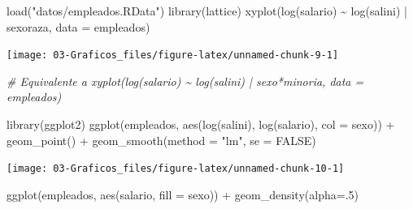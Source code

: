 \documentclass[
]{book}
\newenvironment{Shaded}{\begin{snugshade}}{\end{snugshade}}
\newcommand{\AttributeTok}[1]{\textcolor[rgb]{0.77,0.63,0.00}{#1}}
\newcommand{\CommentTok}[1]{\textcolor[rgb]{0.56,0.35,0.01}{\textit{#1}}}
\newcommand{\ConstantTok}[1]{\textcolor[rgb]{0.00,0.00,0.00}{#1}}
\newcommand{\DecValTok}[1]{\textcolor[rgb]{0.00,0.00,0.81}{#1}}
\newcommand{\FunctionTok}[1]{\textcolor[rgb]{0.00,0.00,0.00}{#1}}
\newcommand{\NormalTok}[1]{#1}
\newcommand{\SpecialCharTok}[1]{\textcolor[rgb]{0.00,0.00,0.00}{#1}}
\newcommand{\StringTok}[1]{\textcolor[rgb]{0.31,0.60,0.02}{#1}}
\theoremstyle{break}
\theoremstyle{nonumberplain}
\begin{document}
\begin{Shaded}
\begin{Highlighting}[]
\FunctionTok{load}\NormalTok{(}\StringTok{"datos/empleados.RData"}\NormalTok{)}
\FunctionTok{library}\NormalTok{(lattice)}
\FunctionTok{xyplot}\NormalTok{(}\FunctionTok{log}\NormalTok{(salario) }\SpecialCharTok{\textasciitilde{}} \FunctionTok{log}\NormalTok{(salini) }\SpecialCharTok{|}\NormalTok{ sexoraza, }\AttributeTok{data =}\NormalTok{ empleados)}
\end{Highlighting}
\end{Shaded}

\begin{center}\texttt{[image: 03-Graficos\_files/figure-latex/unnamed-chunk-9-1]} \end{center}

\begin{Shaded}
\begin{Highlighting}[]
\CommentTok{\# Equivalente a xyplot(log(salario) \textasciitilde{} log(salini) | sexo*minoria, data = empleados)}
\end{Highlighting}
\end{Shaded}

\begin{Shaded}
\begin{Highlighting}[]
\FunctionTok{library}\NormalTok{(ggplot2)}
\FunctionTok{ggplot}\NormalTok{(empleados, }\FunctionTok{aes}\NormalTok{(}\FunctionTok{log}\NormalTok{(salini), }\FunctionTok{log}\NormalTok{(salario), }\AttributeTok{col =}\NormalTok{ sexo)) }\SpecialCharTok{+}
  \FunctionTok{geom\_point}\NormalTok{() }\SpecialCharTok{+}
  \FunctionTok{geom\_smooth}\NormalTok{(}\AttributeTok{method =} \StringTok{"lm"}\NormalTok{, }\AttributeTok{se =} \ConstantTok{FALSE}\NormalTok{)}
\end{Highlighting}
\end{Shaded}

\begin{center}\texttt{[image: 03-Graficos\_files/figure-latex/unnamed-chunk-10-1]} \end{center}

\begin{Shaded}
\begin{Highlighting}[]
\FunctionTok{ggplot}\NormalTok{(empleados, }\FunctionTok{aes}\NormalTok{(salario, }\AttributeTok{fill =}\NormalTok{ sexo)) }\SpecialCharTok{+}
  \FunctionTok{geom\_density}\NormalTok{(}\AttributeTok{alpha=}\NormalTok{.}\DecValTok{5}\NormalTok{)}
\end{Highlighting}
\end{Shaded}
\end{document}
